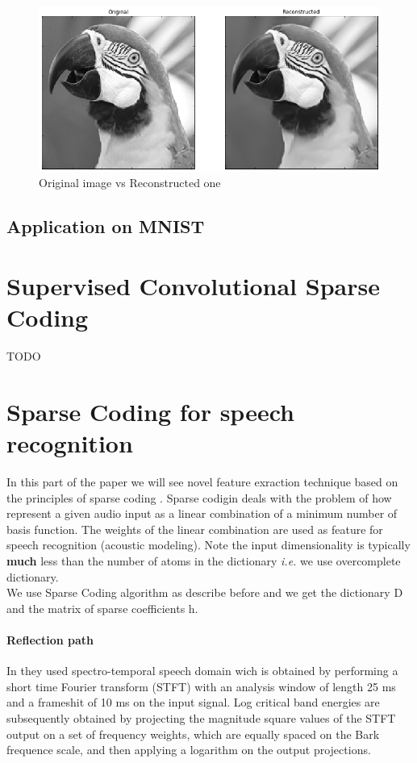 \documentclass[a4paper,10pt]{article}
\begin{document}
\begin{figure}[h]
 \centering
 \includegraphics[scale=0.4]{Results/SPORCO_test_img/recons.png}
 \caption{Original image vs Reconstructed one}
\end{figure}

\newpage
\subsection{Application on MNIST}

\newpage
\section{Supervised Convolutional Sparse Coding}
TODO
\newpage
\section{Sparse Coding for speech recognition}
In this part of the paper we will see novel feature exraction technique based on the principles of sparse coding \cite{DL_speech_reco}. Sparse codigin deals with the problem of how represent a given audio input as a linear combination of a minimum number of basis function. The weights of the linear combination are used as feature for speech recognition (acoustic modeling). Note the input dimensionality is typically \textbf{much} less than the number of atoms in the dictionary \textit{i.e.} we use overcomplete dictionary.\\
We use Sparse Coding algorithm as describe before and we get the dictionary D and  the matrix of sparse coefficients  h.\\
\paragraph{Reflection path} In \cite{DL_speech_reco} they used spectro-temporal speech domain wich is obtained by performing a short time Fourier transform (STFT) with an analysis window of length 25 ms and a frameshit of 10 ms on the input signal. Log critical band energies are subsequently obtained by projecting the magnitude square values of the STFT output on a set of frequency weights, which are equally spaced on the Bark frequence scale, and then applying a logarithm on the output projections.
\newpage


\end{document}
